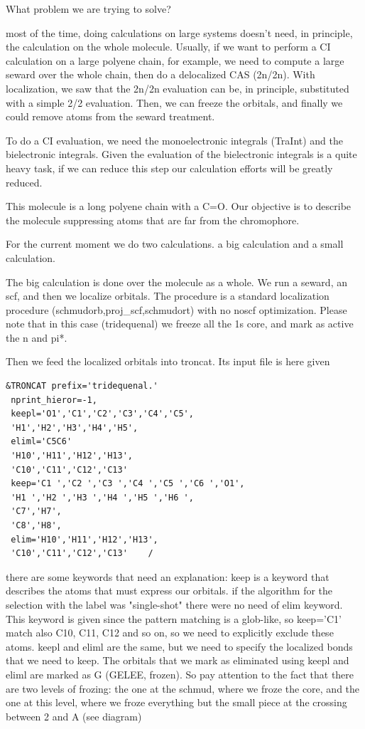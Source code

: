 \documentclass[a4paper,11pt]{report}
\begin{document}
What problem we are trying to solve?

most of the time, doing calculations on large systems doesn't need, in principle,
the calculation on the whole molecule. Usually, if we want to perform a CI
calculation on a large polyene chain, for example, we need to compute a
large seward over the whole chain, then do a delocalized CAS (2n/2n).
With localization, we saw that the 2n/2n evaluation can be, in principle,
substituted with a simple 2/2 evaluation. Then, we can freeze the orbitals,
and finally we could remove atoms from the seward treatment.

To do a CI evaluation, we need the monoelectronic integrals (TraInt) and the
bielectronic integrals. Given the evaluation of the bielectronic integrals
is a quite heavy task, if we can reduce this step our calculation efforts
will be greatly reduced.

This molecule is a long polyene chain with a C=O. Our objective is to
describe the molecule suppressing atoms that are far from the chromophore.

For the current moment we do two calculations. a big calculation and a small
calculation.

The big calculation is done over the molecule as a whole. We run a seward,
an scf, and then we localize orbitals.
The procedure is a standard localization procedure
(schmudorb,proj\_scf,schmudort) with no noscf optimization. Please note that
in this case (tridequenal) we freeze all the 1s core, and mark as active
the n and pi*.

Then we feed the localized orbitals into troncat. Its input file is here given

\begin{verbatim}
&TRONCAT prefix='tridequenal.'
 nprint_hieror=-1,
 keepl='O1','C1','C2','C3','C4','C5',
 'H1','H2','H3','H4','H5',
 eliml='C5C6'
 'H10','H11','H12','H13',
 'C10','C11','C12','C13'
 keep='C1 ','C2 ','C3 ','C4 ','C5 ','C6 ','O1',
 'H1 ','H2 ','H3 ','H4 ','H5 ','H6 ',
 'C7','H7',
 'C8','H8',
 elim='H10','H11','H12','H13',
 'C10','C11','C12','C13'    /
\end{verbatim}

there are some keywords that need an explanation:
keep is a keyword that describes the atoms that must express our orbitals.
if the algorithm for the selection with the label was "single-shot" there
were no need of elim keyword. This keyword is given since the pattern
matching is a glob-like, so keep='C1' match also C10, C11, C12 and so on, so
we need to explicitly exclude these atoms.
keepl and eliml are the same, but we need to specify the localized bonds
that we need to keep. The orbitals that we mark as eliminated using keepl
and eliml are marked as G (GELEE, frozen). So pay attention to the fact that
there are two levels of frozing: the one at the schmud, where we froze the
core, and the one at this level, where we froze everything but the small
piece at the crossing between 2 and A (see diagram)
\end{document}

